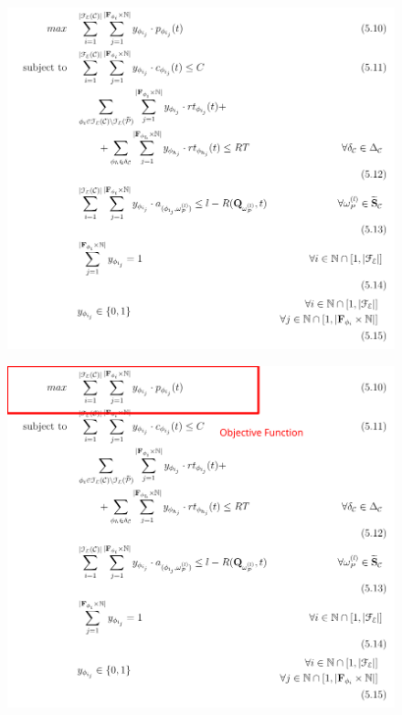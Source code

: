 \documentclass[13.5pt]{beamer}
\begin{document}
\begin{frame}
	
\begin{figure}[h]
	\centering
	\includegraphics[width=\textwidth,height=0.8\columnwidth]{../Images/MMKPForSlide.png}
\end{figure}
	
	
\end{frame}



\begin{frame}
	
	\begin{figure}[h]
		\centering
		\includegraphics[width=\textwidth,height=0.8\columnwidth]{../Images/MMKPForSlide1.png}
	\end{figure}
	
	
\end{frame}
\end{document}
